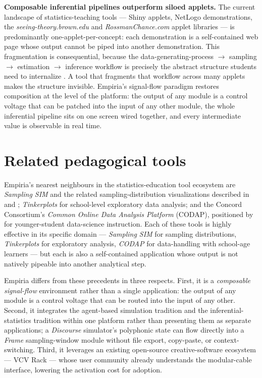 \textbf{Composable inferential pipelines outperform siloed applets.} The
current landscape of statistics-teaching tools --- Shiny applets,
NetLogo demonstrations, the \emph{seeing-theory.brown.edu} and
\emph{RossmanChance.com} applet libraries --- is predominantly
one-applet-per-concept: each demonstration is a self-contained web page
whose output cannot be piped into another demonstration. This
fragmentation is consequential, because the data-generating-process $\rightarrow$
sampling $\rightarrow$ estimation $\rightarrow$ inference workflow is precisely the abstract
structure students need to internalize \citep{cobb2007, tintle2014}. A
tool that fragments that workflow across many applets makes the
structure invisible. Empiria's signal-flow paradigm restores composition
at the level of the platform: the output of any module is a control
voltage that can be patched into the input of any other module, the
whole inferential pipeline sits on one screen wired together, and every
intermediate value is observable in real time.

\section{Related pedagogical tools}\label{related-pedagogical-tools}

Empiria's nearest neighbours in the statistics-education tool ecosystem
are \emph{Sampling SIM} and the related sampling-distribution
visualizations described in \citet{chance2004} and \citet{delmas2007};
\emph{Tinkerplots} \citep{konold2008} for school-level exploratory data
analysis; and the Concord Consortium's \emph{Common Online Data Analysis
Platform} (CODAP), positioned by \citet{finzer2013} for younger-student
data-science instruction. Each of these tools is highly effective in its
specific domain --- \emph{Sampling SIM} for sampling distributions,
\emph{Tinkerplots} for exploratory analysis, \emph{CODAP} for
data-handling with school-age learners --- but each is also a
self-contained application whose output is not natively pipeable into
another analytical step.

Empiria differs from these precedents in three respects. First, it is a
\emph{composable signal-flow} environment rather than a single
application: the output of any module is a control voltage that can be
routed into the input of any other. Second, it integrates the
agent-based simulation tradition and the inferential-statistics
tradition within one platform rather than presenting them as separate
applications; a \emph{Discourse} simulator's polyphonic state can flow
directly into a \emph{Frame} sampling-window module without file export,
copy-paste, or context-switching. Third, it leverages an existing
open-source creative-software ecosystem --- VCV Rack \citep{vcv-rack}
--- whose user community already understands the modular-cable
interface, lowering the activation cost for adoption.


